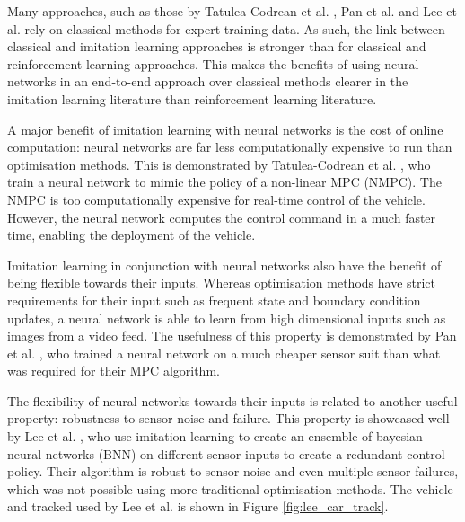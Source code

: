 Many approaches, such as those by Tatulea-Codrean et al. \cite{Tatulea-Codrean2020}, Pan et al. \cite{Pan2017a} and Lee et al. \cite{lee2019} rely on classical methods for expert training data. 
As such, the link between classical and imitation learning approaches is stronger than for classical and reinforcement learning approaches.
This makes the benefits of using neural networks in an end-to-end approach over classical methods clearer in the imitation learning literature than reinforcement learning literature.

A major benefit of imitation learning with neural networks is the cost of online computation: neural networks are far less computationally expensive to run than optimisation methods. This is demonstrated by Tatulea-Codrean et al. \cite{Tatulea-Codrean2020}, who train a neural network to mimic the policy of a non-linear MPC (NMPC). The NMPC is too computationally expensive for real-time control of the vehicle. 
However, the neural network computes the control command in a much faster time, enabling the deployment of the vehicle.

Imitation learning in conjunction with neural networks also have the benefit of being flexible towards their inputs. 
Whereas optimisation methods have strict requirements for their input such as frequent state and boundary condition updates, a neural network is able to learn from high dimensional inputs such as images from a video feed. 
The usefulness of this property is demonstrated by Pan et al. \cite{Pan2017a}, who trained a neural network on a much cheaper sensor suit than what was required for their MPC algorithm.

The flexibility of neural networks towards their inputs is related to another useful property: robustness to sensor noise and failure. 
This property is showcased well by Lee et al. \cite{lee2019}, who use imitation learning to create an ensemble of bayesian neural networks (BNN) on different sensor inputs to create a redundant control policy. 
Their algorithm is robust to sensor noise and even multiple sensor failures, which was not possible using more traditional optimisation methods.
The vehicle and tracked used by Lee et al. \cite{lee2019} is shown in Figure \ref{fig:lee_car_track}.

